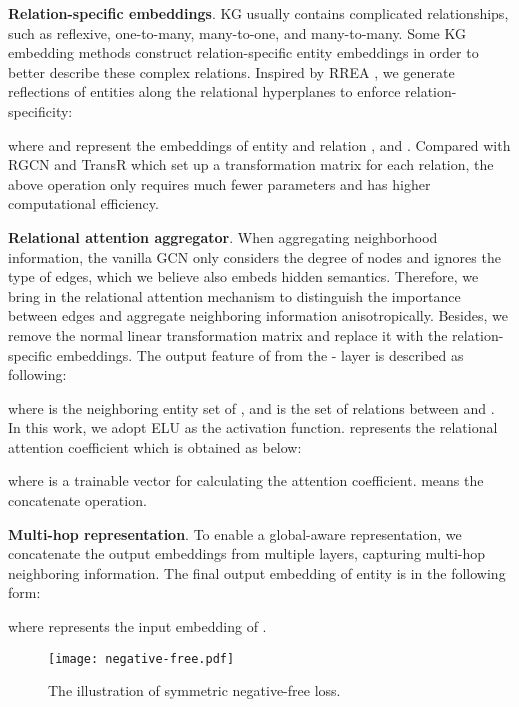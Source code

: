 \documentclass[sigconf]{acmart}
\begin{document}
\vspace{0.5em}
\noindent
\textbf{Relation-specific embeddings}.
KG usually contains complicated relationships, such as reflexive, one-to-many, many-to-one, and many-to-many.
Some KG embedding methods \cite{DBLP:conf/aaai/LinLSLZ15,DBLP:conf/esws/SchlichtkrullKB18} construct relation-specific entity embeddings in order to better describe these complex relations.
Inspired by RREA \cite{DBLP:conf/cikm/MaoWXWL20}, we generate reflections of entities along the relational hyperplanes to enforce relation-specificity:


where  and  represent the embeddings of entity  and relation , and .
Compared with RGCN \cite{DBLP:conf/aaai/LinLSLZ15} and TransR \cite{DBLP:conf/esws/SchlichtkrullKB18} which set up a transformation matrix for each relation, the above operation only requires much fewer parameters and has higher computational efficiency.

\vspace{0.5em}
\noindent
\textbf{Relational attention aggregator}.
When aggregating neighborhood information, the vanilla GCN only considers the degree of nodes and ignores the type of edges, which we believe also embeds hidden semantics.
Therefore, we bring in the relational attention mechanism to distinguish the importance between edges and aggregate neighboring information anisotropically.
Besides, we remove the normal linear transformation matrix and replace it with the relation-specific embeddings.
The output feature of  from the - layer is described as following:

where  is the neighboring entity set of , and  is the set of relations between  and .
In this work, we adopt ELU \cite{DBLP:journals/corr/ClevertUH15} as the activation function.
 represents the relational attention coefficient which is obtained as below:


where  is a trainable vector for calculating the attention coefficient.
 means the concatenate operation.

\vspace{0.5em}
\noindent
\textbf{Multi-hop representation}.
To enable a global-aware representation, we concatenate the output embeddings from multiple layers, capturing multi-hop neighboring information.
The final output embedding of entity  is in the following form:

where  represents the input embedding of .

\begin{figure}
  \centering
  \texttt{[image: negative-free.pdf]}
  \caption{The illustration of symmetric negative-free loss.}\label{fig:negative-free}
\end{figure}
\end{document}
